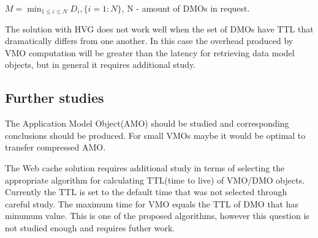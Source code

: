 \begin{center}
	\begin{math}M = \min_{1 \leq i \leq N} D_{i},\{i=1:N\}\end{math}, N - amount of DMOs in request.
\end{center}

The solution with HVG does not work well when the set of DMOs have TTL that dramatically differs from one another. In this case the overhead produced by VMO computation will be greater than the latency for retrieving data model objects, but in general it requires additional study. 

\subsection{Further studies}

The Application Model Object(AMO) should be studied and corresponding conclusions should be produced. For small VMOs maybe it would be optimal to transfer compressed AMO.

The Web cache solution requires additional study in terms of selecting the appropriate algorithm for calculating  TTL(time to live) of VMO/DMO objects. Currently the TTL is set to the default time that was not selected through careful study. The maximum time for VMO equals the TTL of DMO that has minumum value. This is one of the proposed algorithms, however this question is not studied enough and requires futher work.

\newpage
